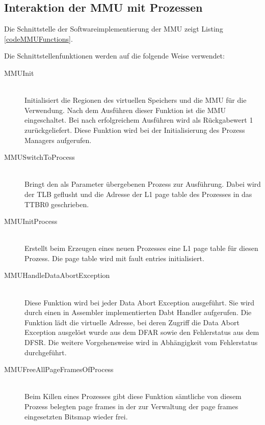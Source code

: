 \subsection{Interaktion der MMU mit Prozessen}

Die Schnittstelle der Softwareimplementierung der MMU zeigt Listing \ref{codeMMUFunctions}.\\


\vspace{0.5cm}

Die Schnittstellenfunktionen werden auf die folgende Weise verwendet: 

\begin{description}
	\item[MMUInit] \hfill \\ Initialisiert die Regionen des virtuellen Speichers und die MMU für die Verwendung. Nach dem Ausführen dieser Funktion ist die MMU eingeschaltet. Bei nach erfolgreichem Ausführen wird als Rückgabewert 1 zurückgeliefert. Diese Funktion wird bei der Initialisierung des Prozess Managers aufgerufen.
	\item[MMUSwitchToProcess] \hfill \\ Bringt den als Parameter übergebenen Prozess zur Ausführung. Dabei wird der TLB geflusht und die Adresse der L1 page table des Prozesses in das TTBR0 geschrieben. 
	\item[MMUInitProcess] \hfill \\ Erstellt beim Erzeugen eines neuen Prozesses eine L1 page table für diesen Prozess. Die page table wird mit fault entries initialisiert.
	\item[MMUHandleDataAbortException] \hfill \\ Diese Funktion wird bei jeder Data Abort Exception ausgeführt. Sie wird durch einen in Assembler implementierten Dabt Handler aufgerufen. Die Funktion lädt die virtuelle Adresse, bei deren Zugriff die Data Abort Exception ausgelöst wurde aus dem \acf{DFAR} sowie den Fehlerstatus aus dem \acf{DFSR}. Die weitere Vorgehensweise wird in Abhängigkeit vom Fehlerstatus durchgeführt.
	\item[MMUFreeAllPageFramesOfProcess] \hfill \\ Beim Killen eines Prozesses gibt diese Funktion sämtliche von diesem Prozess belegten page frames in der zur Verwaltung der page frames eingesetzten Bitsmap wieder frei.
\end{description}

\pagebreak 